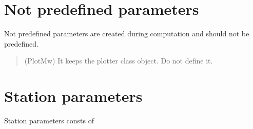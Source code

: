 \documentclass[letterpaper,10pt,english]{sphinxmanual}
\begin{document}
\section{Not predefined parameters}
\label{\detokenize{configuration:not-predefined-parameters}}
\sphinxAtStartPar
Not predefined parameters are created during computation and should not be predefined.
\begin{quote}\begin{description}
\sphinxAtStartPar
(PlotMw) It keeps the plotter class object. Do not define it.

\end{description}\end{quote}


\section{Station parameters}
\label{\detokenize{configuration:station-parameters}}
\sphinxAtStartPar
Station parameters consts of
\end{document}
